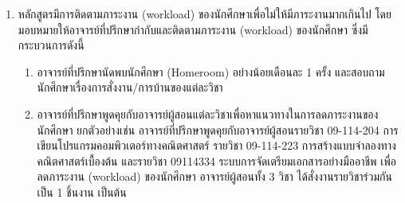 \begin{enumerate}
\item หลักสูตรมีการติดตามภาระงาน (workload) ของนักศึกษาเพื่อไม่ให้มีภาระงานมากเกินไป  โดยมอบหมายให้อาจารย์ที่ปรึกษากำกับและติดตามภาระงาน (workload) ของนักศึกษา ซึ่งมีกระบวนการดังนี้
 \begin{enumerate}[label=(\arabic*),leftmargin=0.8cm, labelsep=2mm]
		\item อาจารย์ที่ปรึกษานัดพบนักศึกษา (Homeroom) อย่างน้อยเดือนละ 1 ครั้ง และสอบถามนักศึกษาเรื่องการสั่งงาน/การบ้านของแต่ละวิชา
		\item อาจารย์ที่ปรึกษาพูดคุยกับอาจารย์ผู้สอนแต่ละวิชาเพื่อหาแนวทางในการลดภาระงานของนักศึกษา ยกตัวอย่างเช่น อาจารย์ที่ปรึกษาพูดคุยกับอาจารย์ผู้สอนรายวิชา 09-114-204  การเขียนโปรแกรมคอมพิวเตอร์ทางคณิตศาสตร์ รายวิชา 09-114-223 การสร้างแบบจำลองทางคณิตศาสตร์เบื้องต้น และรายวิชา 09114334 ระบบการจัดเตรียมเอกสารอย่างมืออาชีพ  เพื่อลดภาระงาน (workload) ของนักศึกษา อาจารย์ผู้สอนทั้ง 3 วิชา ได้สั่งงานรายวิชาร่วมกันเป็น 1 ชิ้นงาน  เป็นต้น
	\end{enumerate}

\end{enumerate}






\begin{doclist}
\end{doclist}



